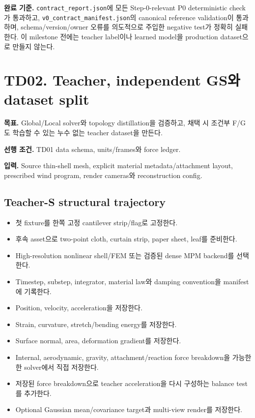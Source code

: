 \documentclass[10pt,a4paper]{article}
\newcommand{\todo}{\textcolor{TodoGray}{\(\square\)}}
\newcommand{\artifact}[1]{\textcolor{ProgressBlue}{\nolinkurl{#1}}}
\begin{document}
\textbf{완료 기준.}
\artifact{contract_report.json}에 모든 Step-0-relevant P0 deterministic check가 통과하고,
\artifact{v0_contract_manifest.json}의 canonical reference validation이 통과하며,
schema/version/owner 오류를 의도적으로 주입한 negative test가 정확히 실패한다.
이 milestone 전에는 teacher label이나 learned model을 production dataset으로 만들지 않는다.

\section{TD02. Teacher, independent GS와 dataset split}

\textbf{목표.}
Global/Local solver와 topology distillation을 검증하고,
채택 시 조건부 F/G도 학습할 수 있는 누수 없는 teacher dataset을 만든다.

\textbf{선행 조건.} TD01 data schema, units/frames와 force ledger.

\textbf{입력.}
Source thin-shell mesh, explicit material metadata/attachment layout, prescribed wind program, render cameras와 reconstruction config.

\subsection*{Teacher-S structural trajectory}

\begin{itemize}
  \item[\todo] 첫 fixture를 한쪽 고정 cantilever strip/flag로 고정한다.
  \item[\todo] 후속 asset으로 two-point cloth, curtain strip, paper sheet, leaf를 준비한다.
  \item[\todo] High-resolution nonlinear shell/FEM 또는 검증된 dense MPM backend를 선택한다.
  \item[\todo] Timestep, substep, integrator, material law와 damping convention을 manifest에 기록한다.
  \item[\todo] Position, velocity, acceleration을 저장한다.
  \item[\todo] Strain, curvature, stretch/bending energy를 저장한다.
  \item[\todo] Surface normal, area, deformation gradient를 저장한다.
  \item[\todo] Internal, aerodynamic, gravity, attachment/reaction force breakdown을 가능한 한 solver에서 직접 저장한다.
  \item[\todo] 저장된 force breakdown으로 teacher acceleration을 다시 구성하는 balance test를 추가한다.
  \item[\todo] Optional Gaussian mean/covariance target과 multi-view render를 저장한다.
\end{itemize}
\end{document}

